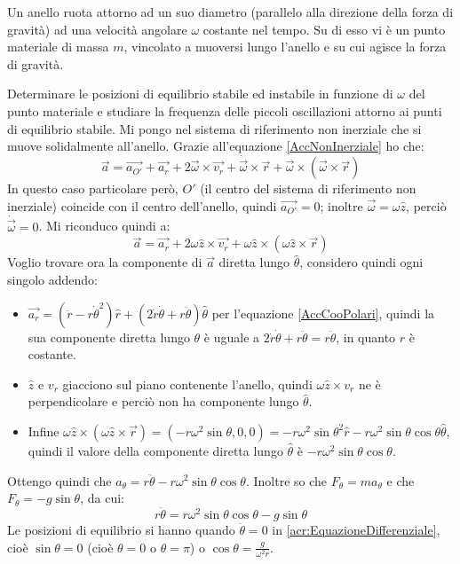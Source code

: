 \documentclass[../main.tex]{subfiles}
\begin{document}
\textex
Un anello ruota attorno ad un suo diametro (parallelo alla direzione della forza di gravità) ad una velocità
angolare $\omega$ costante nel tempo. Su di esso vi è un punto materiale di massa $m$, vincolato a muoversi lungo l'anello e su cui agisce
la forza di gravità.

Determinare le posizioni di equilibrio stabile ed instabile in funzione di $\omega$ del punto materiale e studiare la
frequenza delle piccoli oscillazioni attorno ai punti di equilibrio stabile.
\solution
Mi pongo nel sistema di riferimento non inerziale che si muove solidalmente all'anello. Grazie all'equazione 
\cref{AccNonInerziale}
ho che:
\begin{equation*}
	\overrightarrow{a}=\overrightarrow{a_{O'}}+\overrightarrow{a_r}+2\overrightarrow{\omega}\times \overrightarrow{v_r} 
	+ \dot{\overrightarrow{\omega}}\times \overrightarrow{r}+\overrightarrow{\omega}\times(\overrightarrow{\omega}
	\times\overrightarrow{r})
\end{equation*}
In questo caso particolare però, $O'$ (il centro del sistema di riferimento non inerziale) coincide con il centro
dell'anello, quindi $\overrightarrow{a_{O'}}=0$; inoltre $\overrightarrow{\omega}=\omega \hat{z}$, perciò
$\dot{\overrightarrow{\omega}}=0$. Mi riconduco quindi a:
\begin{equation*}
	\overrightarrow{a}=\overrightarrow{a_r}+2\omega\hat{z}\times \overrightarrow{v_r} 
	+\omega\hat{z}\times(\omega\hat{z}\times\overrightarrow{r})
\end{equation*}
Voglio trovare ora la componente di $\overrightarrow{a}$ diretta lungo $\hat{\theta}$, considero quindi ogni singolo
addendo:
\begin{itemize}
	\item	$\overrightarrow{a_r}=(\ddot{r}-r\dot{\theta}^2)\hat{r}+(2\dot{r}\dot{\theta}+r\ddot{\theta})\hat{\theta}$
			per l'equazione \cref{AccCooPolari}, quindi la sua componente diretta lungo $\theta$ è uguale a $
			2\dot{r}\dot{\theta}+r\ddot{\theta}=r\ddot{\theta}$, in quanto $r$ è costante.
	\item	$\hat{z}$ e $v_r$ giacciono sul piano contenente l'anello, quindi $\omega\hat{z}\times v_r$ ne è perpendicolare
			e perciò non ha componente lungo $\hat{\theta}$.
	\item	Infine $\omega\hat{z}\times(\omega\hat{z}\times\overrightarrow{r})=
			(-r\omega^2\sin\theta,0,0)=-r\omega^2\sin\theta^2\hat{r}-r\omega^2\sin\theta\cos\theta\hat{\theta}$,
			quindi il valore della componente diretta lungo $\hat\theta$ è $-r\omega^2\sin\theta\cos\theta$.
\end{itemize}
Ottengo quindi che $a_\theta=r\ddot{\theta}-r\omega^2\sin\theta\cos\theta$.
Inoltre so che $F_\theta=m a_\theta$ e che $F_\theta=-g\sin\theta$, da cui:
\begin{equation}\label{acr:EquazioneDifferenziale}
	r\ddot{\theta}=r\omega^2\sin\theta\cos\theta-g\sin\theta
\end{equation}
Le posizioni di equilibrio si hanno quando $\ddot\theta=0$ in \cref{acr:EquazioneDifferenziale}, cioè
$\sin\theta=0$ (cioè $\theta=0$ o $\theta=\pi$) o $\cos\theta=\frac{g}{\omega^2r}$. 
\end{document}
